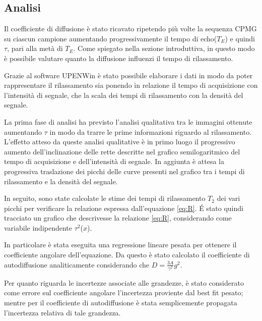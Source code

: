 \subsection*{Analisi}

Il coefficiente di diffusione è stato ricavato ripetendo più volte la sequenza CPMG su ciascun campione aumentando progressivamente il tempo di echo($T_E$) e quindi $\tau$, pari alla metà di $T_E$.
Come spiegato nella sezione introduttiva, in questo modo è possibile  valutare quanto la diffusione influenzi il tempo di rilassamento.

Grazie al software UPENWin è stato possibile elaborare i dati in modo da poter rappresentare il rilassamento sia ponendo in relazione il tempo di acquisizione con l'intensità di segnale, che la scala dei tempi di rilassamento con la densità del segnale.

La prima fase di analisi ha previsto l'analisi qualitativa tra le immagini ottenute aumentando $\tau$ in modo da trarre le prime informazioni riguardo al rilassamento.
L'effetto atteso da queste analisi qualitative è in primo luogo il progressivo aumento dell'inclinazione delle rette descritte nel grafico semilogaritmico del tempo di acquisizione e dell'intensità di segnale.
In aggiunta è attesa la progressiva traslazione dei picchi delle curve presenti nel grafico tra i tempi di rilassamento e la densità del segnale.

In seguito, sono state calcolate le stime dei tempi di rilassamento $T_2$ dei vari picchi per verificare la relazione espressa dall'equazione \ref{eq:R}. 
\'E stato quindi tracciato un grafico che descrivesse la relazione \ref{eq:R}, considerando come variabile indipendente $\tau^2$($x$). 

In particolare è stata eseguita una regressione lineare pesata per ottenere il coefficiente angolare dell'equazione.
Da questo è stato calcolato il coefficiente di autodiffusione analiticamente considerando che $D=\frac{3A}{{\gamma}^2}g^2$.

Per quanto riguarda le incertezze associate alle grandezze, è stato considerato come errore sul coefficiente angolare l'incertezza proviente dal best fit pesato; mentre per il coefficiente di autodiffusione è stata semplicemente propagata l'incertezza relativa di tale grandezza.


